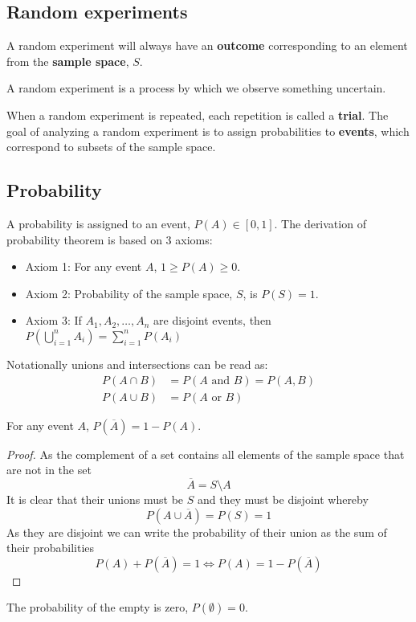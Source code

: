 \subsection{Random experiments}
A random experiment will always have an \textbf{outcome} corresponding to an element from the \textbf{sample space}, $S$.
\begin{definition}
  A random experiment is a process by which we observe something uncertain.
\end{definition}
When a random experiment is repeated, each repetition is called a \textbf{trial}. The goal of analyzing a random experiment is to assign probabilities to \textbf{events}, which correspond to subsets of the sample space.

\subsection{Probability}
A probability is assigned to an event, $P(A)\in[0,1]$. The derivation of probability theorem is based on 3 axioms:
\begin{itemize}
    \item Axiom 1: For any event $A$, $1\geq P(A)\geq 0$.
    \item Axiom 2: Probability of the sample space, $S$, is $P(S)=1$.
    \item Axiom 3: If $A_{1},A_{2},\ldots,A_{n}$ are disjoint events, then $P(\bigcup_{i=1}^{n}A_{i})=\sum_{i=1}^{n}P(A_{i})$
\end{itemize}
Notationally unions and intersections can be read as:
\begin{align*}
    P(A\cap B)&=P(A \text{ and } B)=P(A,B) \\
    P(A\cup B)&=P(A \text{ or } B)
\end{align*}
\begin{theorem}
  For any event $A$, $P(\overline{A})=1-P(A)$.
\end{theorem}
\begin{proof}
  As the complement of a set contains all elements of the sample space that are not in the set
  \[
      \overline{A}=S\setminus A
  \]
  It is clear that their unions must be $S$ and they must be disjoint whereby
  \[
      P(A\cup \overline{A})=P(S)=1
  \]
  As they are disjoint we can write the probability of their union as the sum of their probabilities
  \[
      P(A)+P(\overline{A})=1\Leftrightarrow P(A)=1-P(\overline{A})
  \]
\end{proof}
\begin{theorem}
  The probability of the empty is zero, $P(\emptyset)=0$.
\end{theorem}
